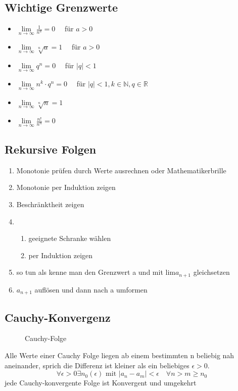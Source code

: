 \documentclass[12pt,a4paper]{article}
\begin{document}
\subsection{Wichtige Grenzwerte}
\begin{itemize}
	\item $\lim\limits_{n\rightarrow \infty} \frac{1}{n^a}=0\quad$ für $a>0$
	\item $\lim\limits_{n\rightarrow \infty} \sqrt[n]{a}=1\quad$ für $a>0$
	\item $\lim\limits_{n\rightarrow \infty} q^n=0\quad$ für $|q|<1$
	\item $\lim\limits_{n\rightarrow \infty} n^k\cdot q^n=0\quad$ für $|q|<1, k\in\mathbb{N}, q\in\mathbb{R}$
	\item $\lim\limits_{n\rightarrow \infty} \sqrt[n]{n}=1$
	\item $\lim\limits_{n\rightarrow \infty} \frac{n!}{n^n}=0$
\end{itemize}


\subsection{Rekursive Folgen}
\begin{enumerate}
	\item Monotonie prüfen durch Werte ausrechnen oder Mathematikerbrille
	\item Monotonie per Induktion zeigen
	\item Beschränktheit zeigen 
	\item \begin{enumerate}
		\item geeignete Schranke wählen
		\item per Induktion zeigen
	\end{enumerate}
	\item so tun als kenne man den Grenzwert a und mit lim$a_{n+1}$ gleichsetzen
	\item $a_{n+1}$ auflösen und dann nach a umformen
\end{enumerate}


\subsection{Cauchy-Konvergenz}
\begin{figure}[htbp]
	\centering
	
	\caption{Cauchy-Folge}
\end{figure}
Alle Werte einer Cauchy Folge liegen ab einem bestimmten n beliebig nah aneinander, sprich die Differenz ist kleiner als ein beliebiges $\epsilon>0$.\\
\[\forall \epsilon > 0 \exists n_0(\epsilon) \text{ mit } |a_n-a_m|<\epsilon\quad\forall n> m\geq n_0\]
jede Cauchy-konvergente Folge ist Konvergent und umgekehrt
\end{document}
